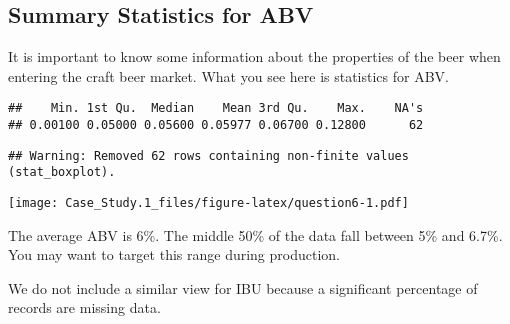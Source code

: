\documentclass[]{article}
\newenvironment{Shaded}{\begin{snugshade}}{\end{snugshade}}
\newcommand{\DataTypeTok}[1]{\textcolor[rgb]{0.13,0.29,0.53}{#1}}
\newcommand{\FloatTok}[1]{\textcolor[rgb]{0.00,0.00,0.81}{#1}}
\newcommand{\KeywordTok}[1]{\textcolor[rgb]{0.13,0.29,0.53}{\textbf{#1}}}
\newcommand{\NormalTok}[1]{#1}
\newcommand{\OperatorTok}[1]{\textcolor[rgb]{0.81,0.36,0.00}{\textbf{#1}}}
\newcommand{\StringTok}[1]{\textcolor[rgb]{0.31,0.60,0.02}{#1}}
\begin{document}
\hypertarget{summary-statistics-for-abv}{%
\subsection{Summary Statistics for
ABV}\label{summary-statistics-for-abv}}

It is important to know some information about the properties of the
beer when entering the craft beer market. What you see here is
statistics for ABV.

\begin{Shaded}
\end{Shaded}

\begin{verbatim}
##    Min. 1st Qu.  Median    Mean 3rd Qu.    Max.    NA's 
## 0.00100 0.05000 0.05600 0.05977 0.06700 0.12800      62
\end{verbatim}

\begin{Shaded}
\end{Shaded}

\begin{verbatim}
## Warning: Removed 62 rows containing non-finite values (stat_boxplot).
\end{verbatim}

\texttt{[image: Case\_Study.1\_files/figure-latex/question6-1.pdf]}

The average ABV is 6\%. The middle 50\% of the data fall between 5\% and
6.7\%. You may want to target this range during production.

We do not include a similar view for IBU because a significant
percentage of records are missing data.
\end{document}
